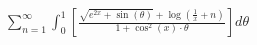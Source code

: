 \documentclass[preview]{standalone}
\begin{document}
\begin{align*}
\sum_{n=1}^{\infty} \int_{0}^{1} \left[ \frac{\sqrt{e^{2x} + \sin(\theta)} + \log\left(\frac{1}{x} + n\right)}{1 + \cos^2(x) \cdot \theta} \right] d\theta
\end{align*}
\end{document}
